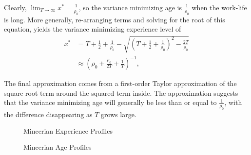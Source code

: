\begin{frame}
	Clearly, $\lim_{T\to\infty} x^* = \frac{1}{\rho_0}$, so the variance minimizing age is $\frac{1}{\rho_0}$ when the work-life is long. More generally, re-arranging terms and solving for the root of this equation, yields the variance minimizing experience level of \\

	\begin{align*}
	x^* & = T + \frac{1}{2} + \frac{1}{\rho_0} - \sqrt{\left(T + \frac{1}{2} + \frac{1}{\rho_0}\right)^2 - \frac{2T}{\rho_0}} \\
	& \approx \left(\rho_0 + \frac{\rho_0}{2T} + \frac{1}{T}\right)^{-1},
	\end{align*}
\end{frame}
\begin{frame}
	The final approximation comes from a first-order Taylor approximation of the square root term around the squared term inside. The approximation suggests that the variance minimizing age will generally be less than or equal to $\frac{1}{\rho_0}$, with the difference disappearing as $T$ grows large.
\end{frame}
\begin{frame}
\begin{figure}[htp]\centering
\caption{Mincerian Experience Profiles}\label{Mincerian Experience Profiles}
\end{figure}
\end{frame}
\begin{frame}
\begin{figure}[htp]\centering
\caption{Mincerian Age Profiles}\label{Mincerian Age Profiles}
\end{figure}
\end{frame}
